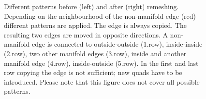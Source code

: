 \begin{figure}
\begin{center}
\begin{subfigure}[b]{.45\textwidth}
\end{subfigure}
\end{center}
\caption{Different patterns before (left) and after (right) remeshing. Depending on the neighbourhood of the non-manifold edge (red) different patterns are applied. The edge is always copied. The resulting two edges are moved in opposite directions. A non-manifold edge is connected to outside-outside (1.row), inside-inside (2.row), two other manifold edges (3.row), inside and another manifold edge (4.row), inside-outside (5.row). In the first and last row copying the edge is not sufficient; new \acp{quad} have to be introduced. Please note that this figure does not cover all possible patterns.}
\label{fig:manifoldPatterns3D}
\end{figure}







